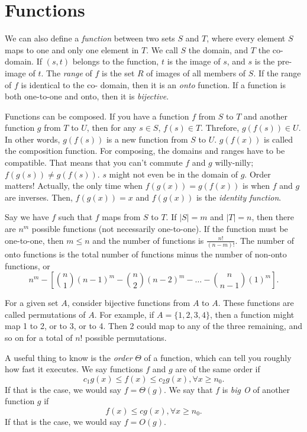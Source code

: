 \documentclass[nobib]{tufte-handout}
\begin{document}
\section{Functions}

We can also define a \emph{function} between two sets $S$ and $T$, where 
every element $S$ maps to one and only one element in $T$. We call $S$ the domain, 
and $T$ the co-domain. If $(s, t)$ belongs to the function, $t$ is the
image of $s$, and $s$ is the pre-image of $t$. The \emph{range} of $f$ is the set $R$
of images of all members of $S$.
If the range of $f$ is identical to the co-
domain, then it is an \emph{onto} function. If a function is both one-to-one 
and onto, then it is \emph{bijective}. 

Functions can be composed. If you have a function $f$ from $S$ to $T$ and another 
function $g$ from $T$ to $U$, then for any $s\in S$, $f(s) \in T$. Threfore, 
$g(f(s)) \in U$. In other words, $g(f(s))$ is a new function from $S$ to $U$. $g(f(x))$ 
is called the composition function. For composing, the domains and ranges have to 
be compatible. That means that you can't commute $f$ and $g$ willy-nilly;
$f(g(s)) \neq g(f(s))$. $s$ might not even be in the domain of $g$. Order matters!
Actually, the only time when $f(g(x)) = g(f(x))$ is when $f$ and $g$ are inverses. 
Then, $f(g(x)) = x$ and $f(g(x))$ is the \emph{identity function}. 
    
Say we have $f$ such that $f$ maps from $S$ to $T$. If $|S| = m$ and $|T| = n$, 
then there are $n^m$ possible functions (not necessarily one-to-one). If the function 
must be one-to-one, then $m \leq n$ and the number of functions is $\frac{n!}{(n-m)!}$.
The number of onto functions is the total number of functions minus the number of non-onto functions, 
or
\[n^m - [{n \choose 1}(n-1)^m - {n \choose 2}(n-2)^m - \dots - {n \choose n-1}(1)^m].\]

For a given set $A$, consider bijective functions from $A$ to $A$. These functions 
are called permutations of $A$. For example, if $A = \{1, 2, 3, 4\}$, then a function might map 
1 to 2, or to 3, or to 4. Then 2 could map to any of the three remaining, and so on 
for a total of $n!$ possible permutations. 

A useful thing to know is the \emph{order} $\Theta$ of a function, 
which can tell you roughly how fast it executes. We say functions $f$ and $g$ 
are of the same order if 
\[c_1g(x) \leq f(x) \leq c_2g(x), \forall x\geq n_0.\]
If that is the case, we would say $f=\Theta(g)$. 
We say that $f$ is \emph{big O} of another function $g$ if 
\[f(x) \leq c g(x), \forall x\geq n_0.\]
If that is the case, we would say $f=O(g)$. 
\end{document}
